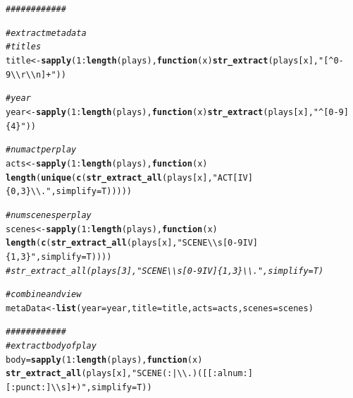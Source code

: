 \documentclass{article}\usepackage[]{graphicx}\usepackage[]{color}
\makeatletter
\newcommand{\hlnum}[1]{\textcolor[rgb]{0.686,0.059,0.569}{#1}}%
\newcommand{\hlstr}[1]{\textcolor[rgb]{0.192,0.494,0.8}{#1}}%
\newcommand{\hlcom}[1]{\textcolor[rgb]{0.678,0.584,0.686}{\textit{#1}}}%
\newcommand{\hlopt}[1]{\textcolor[rgb]{0,0,0}{#1}}%
\newcommand{\hlstd}[1]{\textcolor[rgb]{0.345,0.345,0.345}{#1}}%
\newcommand{\hlkwa}[1]{\textcolor[rgb]{0.161,0.373,0.58}{\textbf{#1}}}%
\newcommand{\hlkwb}[1]{\textcolor[rgb]{0.69,0.353,0.396}{#1}}%
\newcommand{\hlkwc}[1]{\textcolor[rgb]{0.333,0.667,0.333}{#1}}%
\newcommand{\hlkwd}[1]{\textcolor[rgb]{0.737,0.353,0.396}{\textbf{#1}}}%
\newenvironment{kframe}{%
 \def\at@end@of@kframe{}%
 \ifinner\ifhmode%
  \def\at@end@of@kframe{\end{minipage}}%
  \begin{minipage}{\columnwidth}%
 \fi\fi%
 \def\FrameCommand##1{\hskip\@totalleftmargin \hskip-\fboxsep
 \colorbox{shadecolor}{##1}\hskip-\fboxsep
     \hskip-\linewidth \hskip-\@totalleftmargin \hskip\columnwidth}%
 \MakeFramed {\advance\hsize-\width
   \@totalleftmargin\z@ \linewidth\hsize
   \@setminipage}}%
 {\par\unskip\endMakeFramed%
 \at@end@of@kframe}
\newenvironment{knitrout}{}{} %
\makeatother
\begin{document}
\begin{knitrout}
\color{fgcolor}\begin{kframe}
\begin{alltt}
\hlcom{############}

\hlcom{#extract metadata}
\hlcom{#titles}
\hlstd{title} \hlkwb{<-} \hlkwd{sapply}\hlstd{(}\hlnum{1}\hlopt{:}\hlkwd{length}\hlstd{(plays),} \hlkwa{function}\hlstd{(}\hlkwc{x}\hlstd{)} \hlkwd{str_extract}\hlstd{(plays[x],} \hlstr{"[^0-9\textbackslash{}\textbackslash{}r\textbackslash{}\textbackslash{}n]+"}\hlstd{))}

\hlcom{#year}
\hlstd{year} \hlkwb{<-} \hlkwd{sapply}\hlstd{(}\hlnum{1}\hlopt{:}\hlkwd{length}\hlstd{(plays),} \hlkwa{function}\hlstd{(}\hlkwc{x}\hlstd{)} \hlkwd{str_extract}\hlstd{(plays[x],} \hlstr{"^[0-9]\{4\}"}\hlstd{))}

\hlcom{#num act per play}
\hlstd{acts} \hlkwb{<-} \hlkwd{sapply}\hlstd{(}\hlnum{1}\hlopt{:}\hlkwd{length}\hlstd{(plays),} \hlkwa{function}\hlstd{(}\hlkwc{x}\hlstd{)}
  \hlkwd{length}\hlstd{(}\hlkwd{unique}\hlstd{(}\hlkwd{c}\hlstd{(}\hlkwd{str_extract_all}\hlstd{(plays[x],} \hlstr{"ACT [IV]\{0,3\}\textbackslash{}\textbackslash{}."}\hlstd{,} \hlkwc{simplify} \hlstd{= T)))))}

\hlcom{#num scenes per play}
\hlstd{scenes} \hlkwb{<-} \hlkwd{sapply}\hlstd{(}\hlnum{1}\hlopt{:}\hlkwd{length}\hlstd{(plays),} \hlkwa{function}\hlstd{(}\hlkwc{x}\hlstd{)}
  \hlkwd{length}\hlstd{(}\hlkwd{c}\hlstd{(}\hlkwd{str_extract_all}\hlstd{(plays[x],} \hlstr{"SCENE\textbackslash{}\textbackslash{}s[0-9IV]\{1,3\}"}\hlstd{,} \hlkwc{simplify} \hlstd{= T))))}
\hlcom{#str_extract_all(plays[3], "SCENE\textbackslash{}\textbackslash{}s[0-9IV]\{1,3\}\textbackslash{}\textbackslash{}.", simplify = T)}

\hlcom{#combine and view}
\hlstd{metaData} \hlkwb{<-} \hlkwd{list}\hlstd{(}\hlkwc{year} \hlstd{= year,} \hlkwc{title} \hlstd{= title,} \hlkwc{acts} \hlstd{= acts,} \hlkwc{scenes} \hlstd{= scenes)}

\hlcom{############}
\hlcom{#extract body of play}
\hlstd{body}\hlkwb{=}\hlkwd{sapply}\hlstd{(}\hlnum{1}\hlopt{:}\hlkwd{length}\hlstd{(plays),} \hlkwa{function}\hlstd{(}\hlkwc{x}\hlstd{)}
  \hlkwd{str_extract_all}\hlstd{(plays[x],}\hlstr{"SCENE(:|\textbackslash{}\textbackslash{}.)([[:alnum:][:punct:]\textbackslash{}\textbackslash{}s]+)"}\hlstd{,}\hlkwc{simplify}\hlstd{=T))}
\end{alltt}
\end{kframe}
\end{knitrout}
\end{document}
